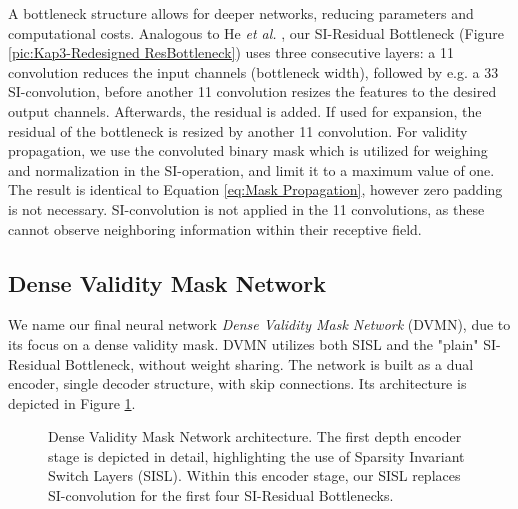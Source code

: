 \documentclass[letterpaper, 10 pt, conference]{ieeeconf}  \usepackage{geometry}
\begin{document}
A bottleneck structure allows for deeper networks, reducing parameters and computational costs. Analogous to He \textit{et al.} \cite{ResBottleneck}, our SI-Residual Bottleneck (Figure \ref{pic:Kap3-Redesigned ResBottleneck}) uses three consecutive layers: a 11 convolution reduces the input channels (bottleneck width), followed by e.g. a 33 SI-convolution, before another 11 convolution resizes the features to the desired output channels. Afterwards, the residual is added. If used for expansion, the residual of the bottleneck is resized by another 11 convolution. For validity propagation, we use the convoluted binary mask which is utilized for weighing and normalization in the SI-operation, and limit it to a maximum value of one. The result is identical to Equation \ref{eq:Mask Propagation}, however zero padding is not necessary. SI-convolution is not applied in the 11 convolutions, as these cannot observe neighboring information within their receptive field.

\subsection{Dense Validity Mask Network}
\label{Kap:Final_NN}
We name our final neural network \textit{Dense Validity Mask Network} (DVMN), due to its focus on a dense validity mask. DVMN utilizes both SISL and the "plain" SI-Residual Bottleneck, without weight sharing. The network is built as a dual encoder, single decoder structure, with skip connections. Its architecture is depicted in Figure \ref{pic:Kap4:Final_Model}.

\begin{figure}[t]
	\centering
	\caption{Dense Validity Mask Network architecture. The first depth encoder stage is depicted in detail, highlighting the use of Sparsity Invariant Switch Layers (SISL). Within this encoder stage, our SISL replaces SI-convolution for the first four SI-Residual Bottlenecks.}
	\label{pic:Kap4:Final_Model}
\end{figure}
\end{document}
